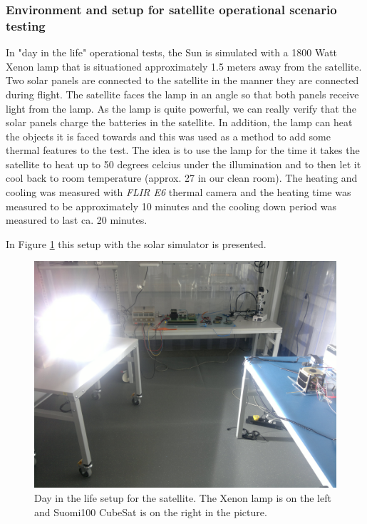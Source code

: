 \documentclass[english,12pt,a4paper,pdftex,elec,utf8]{aaltothesis}
\begin{document}
\subsubsection{Environment and setup for satellite operational scenario testing}
In "day in the life" operational tests, the Sun is simulated with a %
1800 Watt Xenon lamp that is situationed approximately 1.5 meters away from the satellite. Two solar panels are connected to the satellite in the manner they are connected during flight. The satellite faces the lamp in an angle so that both panels receive light from the lamp. As the lamp is quite powerful, we can really verify that the solar panels charge the batteries in the satellite. In addition, the lamp can heat the objects it is faced towards and this was used as a method to add some thermal features to the test. The idea is to use the lamp for the time it takes the satellite to heat up to 50 degrees celcius under the illumination and to then let it cool back to room temperature (approx. 27 in our clean room). The heating and cooling was measured with \textit{FLIR E6} thermal camera and the heating time was measured to be approximately 10 minutes and the cooling down period was measured to last ca. 20 minutes.\par
In Figure \ref{dayinlife1} this setup with the solar simulator is presented.\par
\begin{figure}[h!]
\centering
\includegraphics[scale=0.3]{daysetuplamp2}
\caption{Day in the life setup for the satellite. The Xenon lamp is on the left and Suomi100 CubeSat is on the right in the picture.}
\label{dayinlife1}
\end{figure} 
\end{document}
